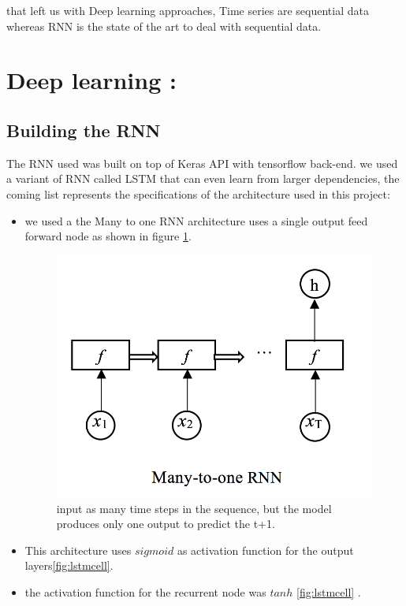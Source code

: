 that left us with Deep learning approaches, Time series are sequential data whereas RNN is the state of the art to deal with sequential data.
\section{Deep learning :}
\subsection{Building the RNN}
The RNN used was built on top of Keras API \cite{keras2015} with tensorflow  back-end. we used a variant of RNN called LSTM  that can even learn from larger dependencies, the coming list represents the specifications of the architecture used in this project:
\begin{itemize}
\item we used a the Many to one RNN architecture  uses a single output feed forward node as shown in figure \ref{fig:manyto_one}.

\begin{figure}[H]
\centering
\includegraphics[scale=.3]{img/many_to_one.png} 
\caption{input as many time steps in the sequence, but the model produces only one output to predict the t+1.}
\label{fig:manyto_one}
\end{figure}

    \item This architecture uses  $sigmoid$  as activation function for the output layers\ref{fig:lstmcell}.
    \item the activation function for the recurrent node was $tanh$ \ref{fig:lstmcell} .
\end{itemize}

